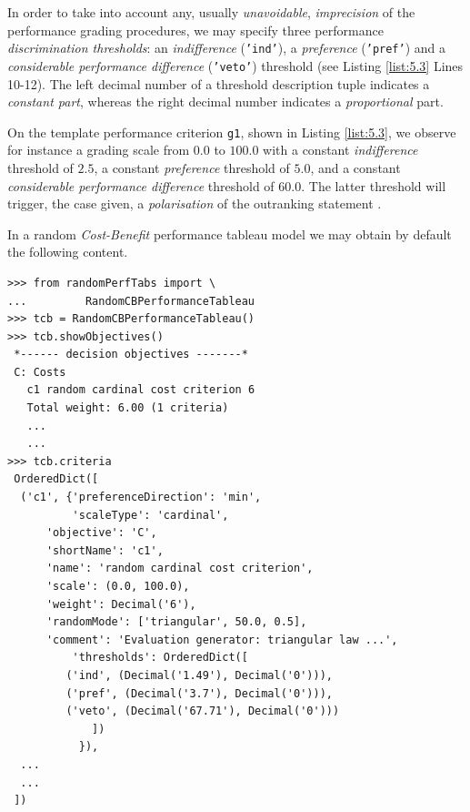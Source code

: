 In order to take into account any, usually \emph{unavoidable}, \emph{imprecision} of the performance grading procedures, we may specify three performance \emph{discrimination thresholds}: an \emph{indifference} (\texttt{'ind'}), a \emph{preference} (\texttt{'pref'}) and a \emph{considerable performance difference} (\texttt{'veto'}) threshold (see Listing \ref{list:5.3} Lines 10-12). The left decimal number of a threshold description tuple indicates a \emph{constant part}, whereas the right decimal number indicates a \emph{proportional} part.

On the template performance criterion \texttt{g1}, shown in Listing \ref{list:5.3}, we observe for instance a grading scale from $0.0$ to $100.0$ with a constant \emph{indifference} threshold of $2.5$, a constant \emph{preference} threshold of $5.0$, and a constant \emph{considerable performance difference} threshold of $60.0$. The latter threshold  will trigger, the case given, a \emph{polarisation} of the outranking statement \citep{BIS-2013}.

In a random \emph{Cost-Benefit} performance tableau model we may obtain by default the following content.

\begin{lstlisting}[caption={Example of cardinal Costs criterion},label=list:5.4]
>>> from randomPerfTabs import \
...         RandomCBPerformanceTableau
>>> tcb = RandomCBPerformanceTableau()
>>> tcb.showObjectives()
 *------ decision objectives -------*
 C: Costs
   c1 random cardinal cost criterion 6
   Total weight: 6.00 (1 criteria)
   ...
   ...
>>> tcb.criteria
 OrderedDict([
  ('c1', {'preferenceDirection': 'min',
          'scaleType': 'cardinal',
	  'objective': 'C',
	  'shortName': 'c1',
	  'name': 'random cardinal cost criterion',
	  'scale': (0.0, 100.0),
	  'weight': Decimal('6'),
	  'randomMode': ['triangular', 50.0, 0.5],
	  'comment': 'Evaluation generator: triangular law ...',
          'thresholds': OrderedDict([
	     ('ind', (Decimal('1.49'), Decimal('0'))),
	     ('pref', (Decimal('3.7'), Decimal('0'))),
	     ('veto', (Decimal('67.71'), Decimal('0')))
             ])
           }),
  ...
  ...
 ])
\end{lstlisting}


